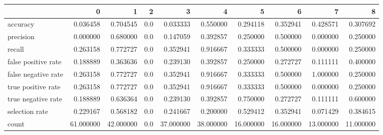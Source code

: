 \begin{tabular}{lrrrrrrrrr}
\toprule
{} &          0 &          1 &    2 &          3 &          4 &          5 &          6 &          7 &          8 \\
\midrule
accuracy            &   0.036458 &   0.704545 &  0.0 &   0.033333 &   0.550000 &   0.294118 &   0.352941 &   0.428571 &   0.307692 \\
precision           &   0.000000 &   0.680000 &  0.0 &   0.147059 &   0.392857 &   0.250000 &   0.500000 &   0.000000 &   0.250000 \\
recall              &   0.263158 &   0.772727 &  0.0 &   0.352941 &   0.916667 &   0.333333 &   0.500000 &   0.000000 &   0.250000 \\
false positive rate &   0.188889 &   0.363636 &  0.0 &   0.239130 &   0.392857 &   0.250000 &   0.272727 &   0.111111 &   0.400000 \\
false negative rate &   0.263158 &   0.772727 &  0.0 &   0.352941 &   0.916667 &   0.333333 &   0.500000 &   1.000000 &   0.250000 \\
true positive rate  &   0.263158 &   0.772727 &  0.0 &   0.352941 &   0.916667 &   0.333333 &   0.500000 &   0.000000 &   0.250000 \\
true negative rate  &   0.188889 &   0.636364 &  0.0 &   0.239130 &   0.392857 &   0.750000 &   0.272727 &   0.111111 &   0.600000 \\
selection rate      &   0.229167 &   0.568182 &  0.0 &   0.241667 &   0.200000 &   0.529412 &   0.352941 &   0.071429 &   0.384615 \\
count               &  61.000000 &  42.000000 &  0.0 &  37.000000 &  38.000000 &  16.000000 &  16.000000 &  13.000000 &  11.000000 \\
\bottomrule
\end{tabular}
